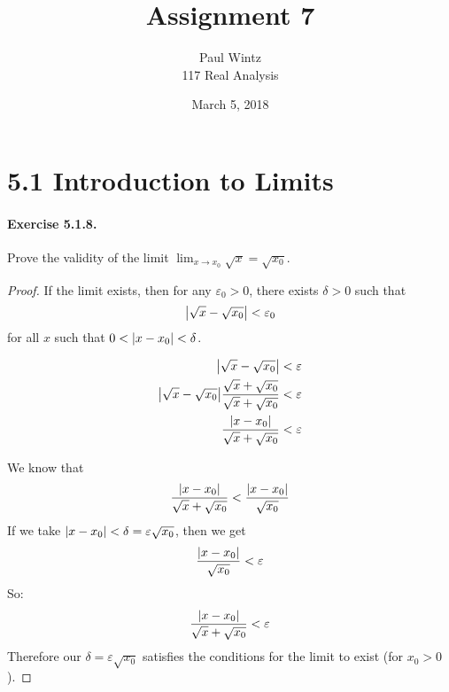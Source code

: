 \documentclass[11pt]{article}
\title{Assignment 7}
\author{Paul Wintz\\117 Real Analysis}
\date{March 5, 2018}
\DeclarePairedDelimiter{\abs}{\lvert}{\rvert}
\def \epsilon {\varepsilon}
\begin{document}
\maketitle


\def \L {\sqrt{x_0}}
\def \M {\sqrt{x_0 + 1} + \L}
\section*{5.1 \textsl{}Introduction to Limits}
\paragraph{Exercise 5.1.8.} Prove the validity of the limit $\lim_{x \rightarrow x_0} \sqrt{x} = \L$.

\begin{proof}

If the limit exists, then for any $\epsilon_0 > 0$, there exists $\delta > 0$ such that 
	$$ \abs*{\sqrt{x} - \L} < \epsilon_0 $$ 
for all $x$ such that $ 0 < \abs*{x - x_0} < \delta$.

\begin{align*}
	\abs*{\sqrt{x} - \L} &< \epsilon \\
	\abs*{\sqrt{x} - \L}\frac{\sqrt{x} + \L}{\sqrt{x} + \L} &< \epsilon \\
	\frac{\abs*{x - x_0}}{\sqrt{x} + \L} &< \epsilon
\end{align*}

We know that 
	$$ \frac{\abs*{x - x_0}}{\sqrt{x} + \L}  < \frac{\abs*{x - x_0}}{\L}$$
If we take  $ \abs*{x - x_0} < \delta = \epsilon \L $, then we get $$\frac{\abs*{x - x_0}}{\L} < \epsilon $$ 
So: 
	$$ \frac{\abs*{x - x_0}}{\sqrt{x} + \L} < \epsilon $$ 
Therefore our $\delta = \epsilon \L$ satisfies the conditions for the limit to exist (for $x_0 > 0$).

\end{proof}
\end{document}
